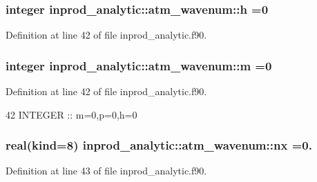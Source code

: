 \subsubsection[{\texorpdfstring{h}{h}}]{\setlength{\rightskip}{0pt plus 5cm}integer inprod\+\_\+analytic\+::atm\+\_\+wavenum\+::h =0\hspace{0.3cm}{\ttfamily [private]}}\hypertarget{structinprod__analytic_1_1atm__wavenum_aa7df1690e97e43365ca0c2b1222924b5}{}\label{structinprod__analytic_1_1atm__wavenum_aa7df1690e97e43365ca0c2b1222924b5}


Definition at line 42 of file inprod\+\_\+analytic.\+f90.

\subsubsection[{\texorpdfstring{m}{m}}]{\setlength{\rightskip}{0pt plus 5cm}integer inprod\+\_\+analytic\+::atm\+\_\+wavenum\+::m =0\hspace{0.3cm}{\ttfamily [private]}}\hypertarget{structinprod__analytic_1_1atm__wavenum_a72be0a86c5f5801b88ebf78506523bd2}{}\label{structinprod__analytic_1_1atm__wavenum_a72be0a86c5f5801b88ebf78506523bd2}


Definition at line 42 of file inprod\+\_\+analytic.\+f90.


\begin{DoxyCode}
42      \textcolor{keywordtype}{INTEGER} :: m=0,p=0,h=0
\end{DoxyCode}
\subsubsection[{\texorpdfstring{nx}{nx}}]{\setlength{\rightskip}{0pt plus 5cm}real(kind=8) inprod\+\_\+analytic\+::atm\+\_\+wavenum\+::nx =0.\hspace{0.3cm}{\ttfamily [private]}}\hypertarget{structinprod__analytic_1_1atm__wavenum_ad67bf9989f5524b1f97dc7211ef78db2}{}\label{structinprod__analytic_1_1atm__wavenum_ad67bf9989f5524b1f97dc7211ef78db2}


Definition at line 43 of file inprod\+\_\+analytic.\+f90.


